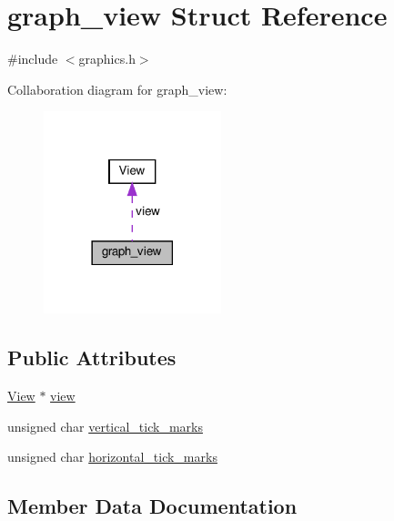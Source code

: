 \hypertarget{structgraph__view}{}\section{graph\+\_\+view Struct Reference}
\label{structgraph__view}


{\ttfamily \#include $<$graphics.\+h$>$}



Collaboration diagram for graph\+\_\+view\+:\nopagebreak
\begin{figure}[H]
\begin{center}
\leavevmode
\includegraphics[width=146pt]{structgraph__view__coll__graph}
\end{center}
\end{figure}
\subsection*{Public Attributes}
\begin{DoxyCompactItemize}
\item 
\hyperlink{structView}{View} $\ast$ \hyperlink{structgraph__view_a44e9bb5000071005cad8bf8fe330ad45}{view}
\item 
unsigned char \hyperlink{structgraph__view_aea851ba75c3cf634c25aa11fcb08299c}{vertical\+\_\+tick\+\_\+marks}
\item 
unsigned char \hyperlink{structgraph__view_ac28c09dcb169d06d829dd6aed28f8685}{horizontal\+\_\+tick\+\_\+marks}
\end{DoxyCompactItemize}


\subsection{Member Data Documentation}
\mbox{\label{structgraph__view_ac28c09dcb169d06d829dd6aed28f8685}} 
